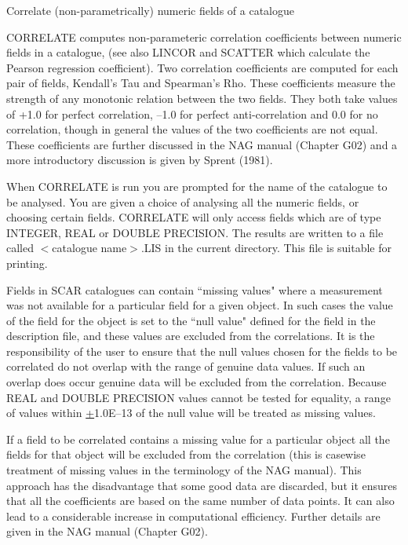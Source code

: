 Correlate (non-parametrically) numeric fields of a catalogue

CORRELATE computes non-parameteric correlation coefficients
between numeric fields in a catalogue, (see also LINCOR and SCATTER
which calculate the Pearson regression coefficient).
Two correlation coefficients are computed for each pair of fields,
Kendall's Tau and Spearman's Rho. 
These coefficients measure the strength of any monotonic relation 
between the two fields. 
They both take values of +1.0 for perfect correlation, --1.0 for perfect
anti-correlation and 0.0 for no correlation, though in general the
values of the two coefficients are not equal. 
These coefficients are further discussed in the NAG manual (Chapter G02) 
and a more introductory discussion is given by Sprent (1981).

When CORRELATE is run you are prompted for the name of the catalogue 
to be analysed. 
You are given a choice of analysing all the numeric fields, or choosing
certain fields.
CORRELATE will only access fields which are of type INTEGER, REAL 
or DOUBLE PRECISION.
The results are written to a file called $<$catalogue name$>$.LIS
in the current directory. 
This file is suitable for printing.

Fields in SCAR catalogues can contain ``missing values" where a
measurement was not available for a particular field for a given
object. 
In such cases the value of the field for the object is
set to the ``null value" defined for the field in the description
file, and these values are excluded from the correlations.
It is the responsibility of the user to ensure that the null values
chosen for the fields to be correlated do not overlap with
the range of genuine data values. 
If such an overlap does occur genuine data will be excluded from 
the correlation. 
Because REAL and DOUBLE PRECISION values cannot be tested for equality, 
a range of values within \underline{+}1.0E--13 of the null value will 
be treated as missing values.

If a field to be correlated contains a missing value for a
particular object all the fields for that object will be excluded
from the correlation (this is casewise treatment of missing values
in the terminology of the NAG manual). 
This approach has the disadvantage that some good data are discarded, 
but it ensures that all the coefficients are based on the same number 
of data points. 
It can also lead to a considerable increase in computational efficiency.
Further details are given in the NAG manual (Chapter G02).

